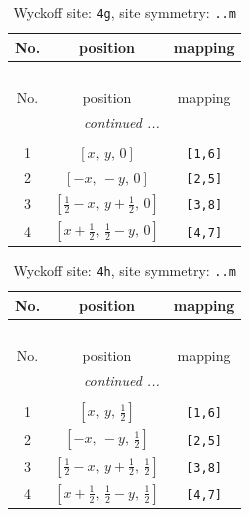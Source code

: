 \documentclass[fleqn,8pt]{jsarticle}
\begin{document}
\renewcommand{\arraystretch}{1.2}
\begin{longtable}{ccc}
\caption{Wyckoff site: {\tt 4g}, site symmetry: {\tt ..m}}
 \\
 \hline \hline
No. & position & mapping \\ \hline \endfirsthead

\multicolumn{2}{l}{\tablename\ \thetable{}} \\
 \hline \hline
No. & position & mapping \\ \hline \endhead

 \hline \hline
\multicolumn{2}{r}{\footnotesize\it continued ...} \\ \endfoot

 \hline \hline
\multicolumn{2}{r}{} \\ \endlastfoot

1 & $\left[ x,\, y,\, 0 \right]$ & {\tt [1,6]} \\ \hline
2 & $\left[ - x,\, - y,\, 0 \right]$ & {\tt [2,5]} \\ \hline
3 & $\left[ \frac{1}{2} - x,\, y + \frac{1}{2},\, 0 \right]$ & {\tt [3,8]} \\ \hline
4 & $\left[ x + \frac{1}{2},\, \frac{1}{2} - y,\, 0 \right]$ & {\tt [4,7]} \\
\end{longtable}
\renewcommand{\arraystretch}{1.2}
\begin{longtable}{ccc}
\caption{Wyckoff site: {\tt 4h}, site symmetry: {\tt ..m}}
 \\
 \hline \hline
No. & position & mapping \\ \hline \endfirsthead

\multicolumn{2}{l}{\tablename\ \thetable{}} \\
 \hline \hline
No. & position & mapping \\ \hline \endhead

 \hline \hline
\multicolumn{2}{r}{\footnotesize\it continued ...} \\ \endfoot

 \hline \hline
\multicolumn{2}{r}{} \\ \endlastfoot

1 & $\left[ x,\, y,\, \frac{1}{2} \right]$ & {\tt [1,6]} \\ \hline
2 & $\left[ - x,\, - y,\, \frac{1}{2} \right]$ & {\tt [2,5]} \\ \hline
3 & $\left[ \frac{1}{2} - x,\, y + \frac{1}{2},\, \frac{1}{2} \right]$ & {\tt [3,8]} \\ \hline
4 & $\left[ x + \frac{1}{2},\, \frac{1}{2} - y,\, \frac{1}{2} \right]$ & {\tt [4,7]} \\
\end{longtable}
\end{document}
